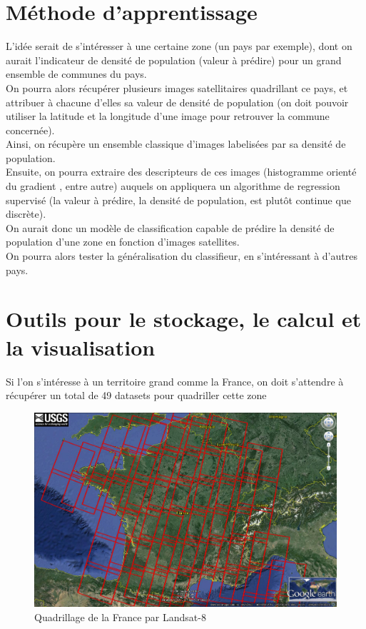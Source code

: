 \documentclass{book}
\begin{document}
\chapter{Méthode d'apprentissage}

L'idée serait de s'intéresser à une certaine zone (un pays par exemple), dont on aurait l'indicateur de densité de population (valeur 
à prédire) pour un grand ensemble de communes du pays.\\
On pourra alors récupérer plusieurs images satellitaires quadrillant ce pays, et attribuer à chacune d'elles
sa valeur de densité de population (on doit pouvoir utiliser la latitude et la longitude d'une image pour retrouver la commune concernée).\\
Ainsi, on récupère un ensemble classique d'images labelisées par sa densité de population.\\
Ensuite, on pourra extraire des descripteurs de ces images (histogramme orienté du gradient \cite{Dalal05histogramsof}, entre autre)
auquels on appliquera un algorithme de regression supervisé (la valeur à prédire, la densité de
population, est plut\^{o}t continue que discrète).\\
On aurait donc un modèle de classification capable de prédire la densité de population d'une zone en fonction d'images satellites.\\
On pourra alors tester la généralisation du classifieur, en s'intéressant à d'autres pays.\\

\chapter{Outils pour le stockage, le calcul et la visualisation}

Si l'on s'intéresse à un territoire grand comme la France, on doit s'attendre à récupérer un total de 49 datasets 
pour quadriller cette zone \cite{quadrillage}\\
\begin{figure}[H]
\begin{center}
\includegraphics[scale=0.25]{emrpise_france_landsat8.jpg}
\end{center}
\caption{Quadrillage de la France par Landsat-8 \cite{geosud}}
\label{quadrillage}
\end{figure}
\clearpage
\end{document}
